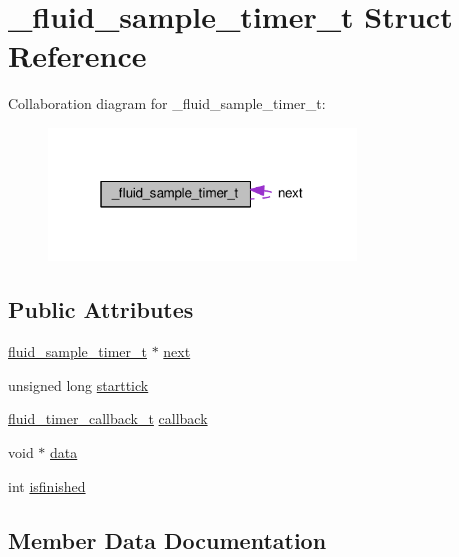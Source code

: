 \hypertarget{struct__fluid__sample__timer__t}{}\section{\+\_\+fluid\+\_\+sample\+\_\+timer\+\_\+t Struct Reference}
\label{struct__fluid__sample__timer__t}


Collaboration diagram for \+\_\+fluid\+\_\+sample\+\_\+timer\+\_\+t\+:
\nopagebreak
\begin{figure}[H]
\begin{center}
\leavevmode
\includegraphics[width=232pt]{struct__fluid__sample__timer__t__coll__graph}
\end{center}
\end{figure}
\subsection*{Public Attributes}
\begin{DoxyCompactItemize}
\item 
\hyperlink{fluidsynth__priv_8h_a4ddade88911e1873bccda1a7750a848c}{fluid\+\_\+sample\+\_\+timer\+\_\+t} $\ast$ \hyperlink{struct__fluid__sample__timer__t_a981391285aa105093ba343286f2861c6}{next}
\item 
unsigned long \hyperlink{struct__fluid__sample__timer__t_af750cdf98b310863bfb66f7595ec6129}{starttick}
\item 
\hyperlink{fluid__sys_8h_a99c65ece4353146a7d260e34df6477d4}{fluid\+\_\+timer\+\_\+callback\+\_\+t} \hyperlink{struct__fluid__sample__timer__t_ad28dc7ab5aad17200f69d41244c411d5}{callback}
\item 
void $\ast$ \hyperlink{struct__fluid__sample__timer__t_acc12750f607d75ddfc1c48945d660e60}{data}
\item 
int \hyperlink{struct__fluid__sample__timer__t_ae34fb1268e31a141546b8fef5acaa321}{isfinished}
\end{DoxyCompactItemize}


\subsection{Member Data Documentation}
\mbox{\label{struct__fluid__sample__timer__t_ad28dc7ab5aad17200f69d41244c411d5}} 
